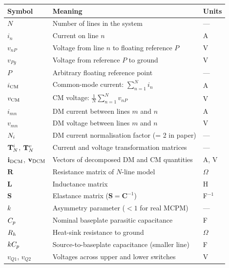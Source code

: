 \begin{center}
\renewcommand{\arraystretch}{1.35}
\begin{tabular}{lll}
\toprule
\textbf{Symbol} & \textbf{Meaning} & \textbf{Units} \\
\midrule
$N$                 & Number of lines in the system                  & --- \\
$i_n$               & Current on line $n$                            & A   \\
$v_{nP}$            & Voltage from line $n$ to floating reference $P$ & V   \\
$v_{Pg}$            & Voltage from reference $P$ to ground            & V   \\
$P$                 & Arbitrary floating reference point              & --- \\
$i_{\mathrm{CM}}$              & Common-mode current: $\sum_{n=1}^{N} i_n$      & A   \\
$v_{\mathrm{CM}}$              & CM voltage: $\frac{1}{N}\sum_{n=1}^{N} v_{nP}$ & V   \\
$i_{mn}$            & DM current between lines $m$ and $n$           & A   \\
$v_{mn}$            & DM voltage between lines $m$ and $n$           & V   \\
$N_{i}$               & DM current normalisation factor (= 2 in paper) & --- \\
$\mathbf{T}^{i}_{N}$, $\mathbf{T}^{v}_{N}$      & Current and voltage transformation matrices     & --- \\
$\mathbf{i}_{\mathrm{DCM}}$, $\mathbf{v}_{\mathrm{DCM}}$    & Vectors of decomposed DM and CM quantities      & A, V \\
$\mathbf{R}$        & Resistance matrix of $N$-line model             & $\Omega$ \\
$\mathbf{L}$        & Inductance matrix                               & H   \\
$\mathbf{S}$        & Elastance matrix ($\mathbf{S} = \mathbf{C}^{-1}$) & F$^{-1}$ \\
$k$                 & Asymmetry parameter ($< 1$ for real MCPM)      & --- \\
$C_{p}$               & Nominal baseplate parasitic capacitance         & F   \\
$R_{h}$               & Heat-sink resistance to ground                  & $\Omega$ \\
$kC_{p}$              & Source-to-baseplate capacitance (smaller line)  & F   \\
$v_{Q1}$, $v_{Q2}$  & Voltages across upper and lower switches        & V   \\

\end{tabular}
\end{center}
